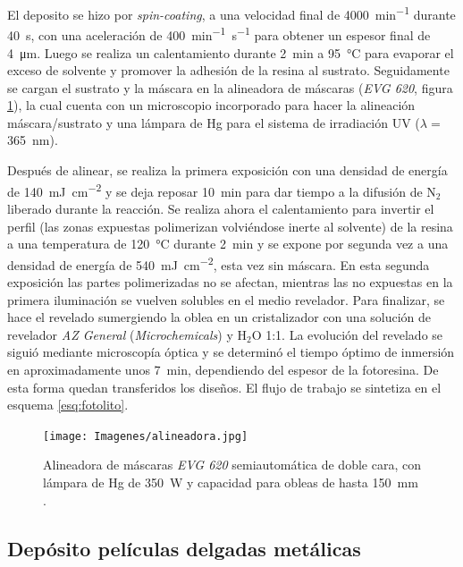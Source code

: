		El deposito se hizo por \textit{spin-coating}, a una velocidad final de \SI{4000}{\minute^{-1}} durante \SI{40}{\second}, con una aceleración de \SI{400}{\minute^{-1}.\second^{-1}} para obtener un espesor final de \SI{4}{\um}. Luego se realiza un calentamiento durante \SI{2}{\minute} a \SI{95}{\celsius} para evaporar el exceso de solvente y promover la adhesión de la resina al sustrato. Seguidamente se cargan el sustrato y la máscara en la alineadora de máscaras (\textit{EVG 620}, figura \ref{fig:alineadora}), la cual cuenta con un microscopio incorporado para hacer la alineación máscara/sustrato y una lámpara de Hg para el sistema de irradiación UV ($\lambda=$\SI{365}{\nm}). 
				
		Después de alinear, se realiza la primera exposición con una densidad de energía de \SI{140}{mJ.\cm^{-2}} y se deja reposar \SI{10}{\minute} para dar tiempo a la difusión de N$_2$ liberado durante la reacción. Se realiza ahora el calentamiento para invertir el perfil (las zonas expuestas polimerizan volviéndose inerte al solvente) de la resina a una temperatura de \SI{120}{\celsius} durante \SI{2}{\minute}  y se expone por segunda vez a una densidad de energía de \SI{540}{mJ.cm^{-2}}, esta vez sin máscara. En esta segunda exposición las partes polimerizadas no se afectan, mientras las no expuestas en la primera iluminación se vuelven solubles en el medio revelador. Para finalizar, se hace el revelado sumergiendo la oblea en un cristalizador con una solución de revelador \textit{AZ General} (\textit{Microchemicals}) y H$_2$O 1:1. La evolución del revelado se siguió mediante microscopía óptica y se determinó el tiempo óptimo de inmersión en aproximadamente unos \SI{7}{\minute}, dependiendo del espesor de la fotoresina. De esta forma quedan transferidos los diseños. El flujo de trabajo se sintetiza en el esquema \ref{esq:fotolito}.
				
			  \begin{figure}[h!]
			  \begin{center}
			  \texttt{[image: Imagenes/alineadora.jpg]}
			  \caption[Alineadora de máscaras]{Alineadora de máscaras \textit{EVG 620} semiautomática de doble cara, con lámpara de Hg de \SI{350}{W}  y capacidad para obleas de hasta \SI{150}{\mm} .}
			  \label{fig:alineadora}
			  \end{center}
			  \end{figure}

	\subsection{Depósito películas delgadas metálicas}\label{sec:sputt}

